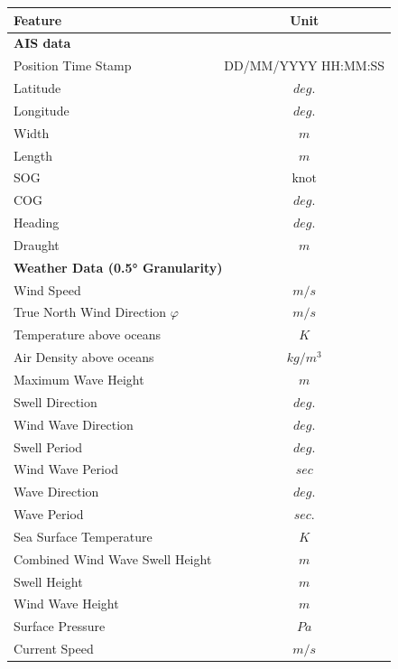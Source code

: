 \begin{table}
    {\begin{tabular}{ |p{8cm}|c| }
    \hline
    \textbf{Feature} & \textbf{Unit} \\
    \hline
    \multicolumn{2}{|l|}{\textbf{AIS data}}\\
    \hline
    Position Time Stamp & DD\slash MM\slash YYYY HH:MM:SS\\
    \hline
    Latitude & $deg.$\\
    \hline
    Longitude & $deg.$ \\
    \hline
    Width & $m$ \\
    \hline
    Length & $m$ \\
    \hline
    SOG & $\text{knot}$ \\
    \hline
    COG & $deg.$ \\
    \hline
    Heading & $deg.$ \\
    \hline
    Draught & $m$ \\
    \hline
    \multicolumn{2}{|l|}{\textbf{Weather Data (0.5° Granularity)}}\\
    \hline
    Wind Speed & $m/s$ \\
    \hline
    True North Wind Direction $\varphi$ & $m/s$ \\
    \hline
    Temperature above oceans & $K$ \\
    \hline
    Air Density above oceans & $kg/m^3$\\
    \hline
    Maximum Wave Height & $m$ \\
    \hline
    Swell Direction & $deg.$\\
    \hline
    Wind Wave Direction & $deg.$ \\
    \hline
    Swell Period & $deg.$ \\
    \hline
    Wind Wave Period & $sec$\\
    \hline
    Wave Direction & $deg.$\\
    \hline
    Wave Period & $sec.$\\
    \hline
    Sea Surface Temperature & $K$\\
    \hline
    Combined Wind Wave Swell Height & $m$ \\
    \hline
    Swell Height & $m$\\
    \hline
    Wind Wave Height & $m$ \\
    \hline
    Surface Pressure & $Pa$ \\
    \hline
    Current Speed & $m/s$\\

\end{tabular}}
\end{table}
